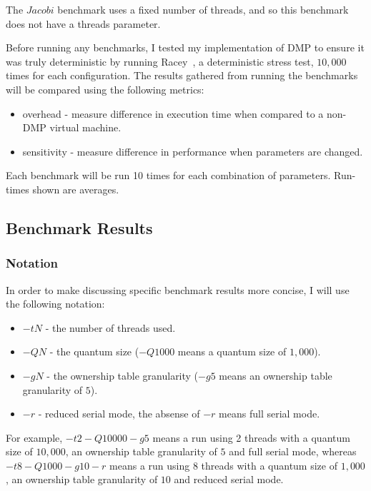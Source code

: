 The $Jacobi$ benchmark uses a fixed number of threads, and so this
benchmark does not have a threads parameter.

Before running any benchmarks, I tested my implementation of DMP to
ensure it was truly deterministic by running Racey~\cite{racey}, a
deterministic stress test, $10,000$ times for each configuration.  The
results gathered from running the benchmarks will be compared using
the following metrics:

\begin{itemize}
\item overhead - measure difference in execution time when compared to
  a non-DMP virtual machine.

\item sensitivity - measure difference in performance when parameters
  are changed.
\end{itemize}

Each benchmark will be run 10 times for each combination of
parameters.  Run-times shown are averages.

\subsection{Benchmark Results}

\subsubsection{Notation}

In order to make discussing specific benchmark results more concise, I
will use the following notation:

\begin{itemize}
\item $-tN$ - the number of threads used.

\item $-QN$ - the quantum size ($-Q1000$ means a quantum size of
  $1,000$).

\item $-gN$ - the ownership table granularity ($-g5$ means an
  ownership table granularity of $5$).

\item $-r$ - reduced serial mode, the absense of $-r$ means full
  serial mode.
\end{itemize}

For example, $-t2 -Q10000 -g5$ means a run using 2 threads with a
quantum size of $10,000$, an ownership table granularity of $5$ and
full serial mode, whereas $-t8 -Q1000 -g10 -r$ means a run using 8
threads with a quantum size of $1,000$, an ownership table granularity
of $10$ and reduced serial mode.

